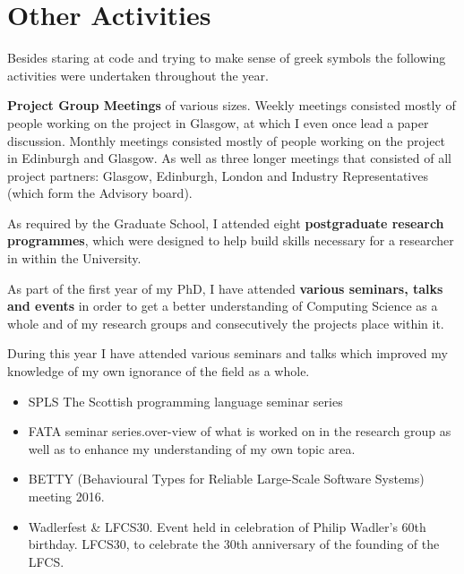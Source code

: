 \section{Other Activities}
\label{sec:Activities}

Besides staring at code and trying to make sense of greek symbols the following activities were undertaken throughout the year.

\textbf{Project Group Meetings} of various sizes. Weekly meetings consisted mostly of people working on the project in Glasgow, at which I even once lead a paper discussion. Monthly meetings consisted mostly of people working on the project in Edinburgh and Glasgow. As well as three longer meetings that consisted of all project partners: Glasgow, Edinburgh, London and Industry Representatives (which form the Advisory board).

As required by the Graduate School, I attended eight \textbf{postgraduate research programmes}, which were designed to help build skills necessary for a researcher in within the University.



As part of the first year of my PhD, I have attended \textbf{various seminars, talks and events} in order to get a better understanding of Computing Science as a whole and of my research groups and consecutively the projects place within it.

During this year I have attended various seminars and talks which improved my knowledge of my own ignorance of the field as a whole.

\begin{itemize}
  \item SPLS
  The Scottish programming language seminar series
  \item FATA seminar series.over-view of what is worked on in the research group as well as to enhance my understanding of my own topic area.
  \item BETTY (Behavioural Types for Reliable Large-Scale Software Systems) meeting 2016.
  \item Wadlerfest \& LFCS30. Event held in celebration of Philip Wadler's 60th birthday. LFCS30, to celebrate the 30th anniversary of the founding of the LFCS.
\end{itemize}
